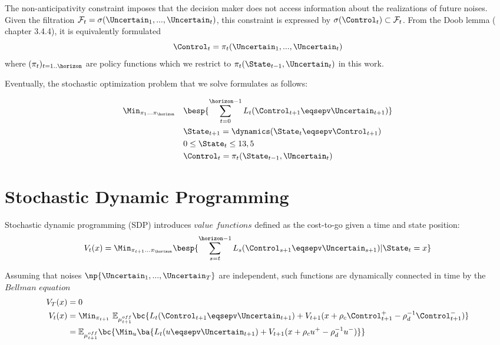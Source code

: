 \documentclass[10pt,a4paper]{article}
\begin{document}
\noindent The non-anticipativity constraint imposes that the decision maker does not access information about the realizations of future noises. Given the filtration $\mathcal{F}_t = \sigma(\Uncertain_1, ..., \Uncertain_t)$, this constraint is expressed by $\sigma(\Control_t) \subset \mathcal{F}_t$. From the Doob lemma (\cite{carpentier2015stochastic} chapter 3.4.4), it is equivalently formulated 
\[\Control_t = \pi_t(\Uncertain_1, ..., \Uncertain_t) \]
\noindent where $(\pi_t)_{t=1..\horizon}$ are policy functions which we restrict to $\pi_t(\State_{t-1}, \Uncertain_t)$ in this work.

\vspace{0.5cm}

\noindent Eventually, the stochastic optimization problem that we solve formulates as follows:

\begin{equation}
\begin{aligned}
& \Min_{\pi_1 ... \pi_\horizon} 
& & \besp{\sum_{t=0}^{\horizon-1} L_t(\Control_{t+1} \eqsepv \Uncertain_{t+1})} \\
&&& \State_{t+1} =  \dynamics(\State_t \eqsepv \Control_{t+1}) \\
&&& 0 \leq \State_t \leq 13,5 \\
&&& \Control_t = \pi_t(\State_{t-1}, \Uncertain_t)
\end{aligned}
\label{eq1.1}
\end{equation}

\section{Stochastic Dynamic Programming}

Stochastic dynamic programming (SDP) introduces $\textit{value functions}$ defined as the cost-to-go given a time and state position:
\[ V_t(x) = \Min_{\pi_{t+1} ... \pi_\horizon} \besp{\sum_{s=t}^{\horizon-1} L_s(\Control_{s+1} \eqsepv \Uncertain_{s+1}) | \State_t = x} \]

\noindent Assuming that noises $\np{\Uncertain_1, ..., \Uncertain_T}$ are independent, such functions are dynamically connected in time by the $\textit{Bellman equation}$
\begin{equation}
\begin{aligned}
V_T(x) &=  0  \\
V_t(x) &= \Min_{\pi_{t+1}} \ \mathbb{E}_{\mu_{t+1}^{off}} \bc{L_t(\Control_{t+1} \eqsepv \Uncertain_{t+1}) + V_{t+1}(x + \rho_c \Control_{t+1}^+ -\rho_d^{-1} \Control_{t+1}^-)} \\
&= \mathbb{E}_{\mu_{t+1}^{off}} \bc{ \Min_u \ba{L_t(u \eqsepv \Uncertain_{t+1}) + V_{t+1}(x + \rho_c u^+ -\rho_d^{-1} u^-)}} 
\end{aligned}
\label{eq2.1}
\end{equation}
\end{document}
